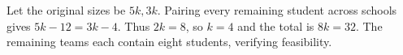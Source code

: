 Let the original sizes be $5k,3k$. Pairing every remaining student across schools gives $5k-12=3k-4$. Thus $2k=8$, so $k=4$ and the total is $8k=\boxed{32}$. The remaining teams each contain eight students, verifying feasibility.
